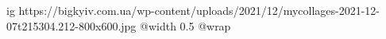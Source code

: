  
 
 
 
 

\ifcmt
  ig https://bigkyiv.com.ua/wp-content/uploads/2021/12/mycollages-2021-12-07t215304.212-800x600.jpg
  @width 0.5
  @wrap 
\fi

